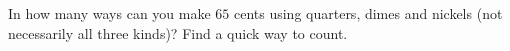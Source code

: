 In how many ways can you make $65$ cents using quarters, dimes and nickels (not necessarily all three kinds)? Find a quick way to count.
